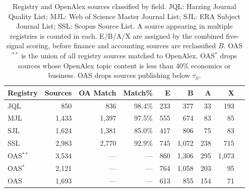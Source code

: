 \begin{table}[htbp]
\centering
\caption{Registry and OpenAlex sources classified by field. JQL:
        Harzing Journal Quality List; MJL: Web of Science Master Journal List; SJL: ERA Subject Journal List; SSL: Scopus Source List. A source appearing in multiple registries is counted in each. E/B/A/X are assigned by the combined five-signal scoring, before finance and accounting sources are reclassified $B$. OAS$^{**}$ is the union of all registry sources matched to OpenAlex. OAS$^{*}$ drops sources whose OpenAlex topic content is less than 40\% economics or business. OAS drops sources publishing below $\tau_S$.}
\label{tab:registry_overview}
\begin{tabular}{lrrrrrrrr}
\toprule
Registry & Sources & OA Match & Match\% & E & B & A & X \\
\midrule
JQL & 850 & 836 & 98.4\% & 233 & 377 & 33 & 193 \\
MJL & 1,433 & 1,397 & 97.5\% & 555 & 674 & 83 & 85 \\
SJL & 1,624 & 1,381 & 85.0\% & 417 & 806 & 75 & 83 \\
SSL & 2,983 & 2,770 & 92.9\% & 745 & 1,072 & 238 & 715 \\
\midrule
OAS$^{**}$ & 3,534 & --- & --- & 860 & 1,306 & 295 & 1,073 \\
OAS$^{*}$ & 2,121 & --- & --- & 764 & 1,058 & 203 & 95 \\
OAS & 1,693 & --- & --- & 613 & 855 & 154 & 71 \\
\bottomrule
\end{tabular}
\end{table}
